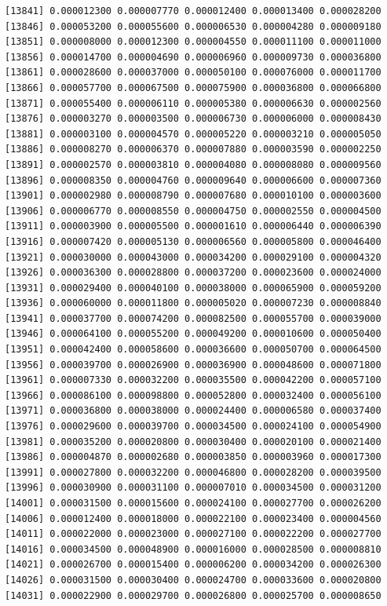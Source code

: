 \documentclass[]{article}
\begin{document}
\begin{verbatim}
[13841] 0.000012300 0.000007770 0.000012400 0.000013400 0.000028200
[13846] 0.000053200 0.000055600 0.000006530 0.000004280 0.000009180
[13851] 0.000008000 0.000012300 0.000004550 0.000011100 0.000011000
[13856] 0.000014700 0.000004690 0.000006960 0.000009730 0.000036800
[13861] 0.000028600 0.000037000 0.000050100 0.000076000 0.000011700
[13866] 0.000057700 0.000067500 0.000075900 0.000036800 0.000066800
[13871] 0.000055400 0.000006110 0.000005380 0.000006630 0.000002560
[13876] 0.000003270 0.000003500 0.000006730 0.000006000 0.000008430
[13881] 0.000003100 0.000004570 0.000005220 0.000003210 0.000005050
[13886] 0.000008270 0.000006370 0.000007880 0.000003590 0.000002250
[13891] 0.000002570 0.000003810 0.000004080 0.000008080 0.000009560
[13896] 0.000008350 0.000004760 0.000009640 0.000006600 0.000007360
[13901] 0.000002980 0.000008790 0.000007680 0.000010100 0.000003600
[13906] 0.000006770 0.000008550 0.000004750 0.000002550 0.000004500
[13911] 0.000003900 0.000005500 0.000001610 0.000006440 0.000006390
[13916] 0.000007420 0.000005130 0.000006560 0.000005800 0.000046400
[13921] 0.000030000 0.000043000 0.000034200 0.000029100 0.000004320
[13926] 0.000036300 0.000028800 0.000037200 0.000023600 0.000024000
[13931] 0.000029400 0.000040100 0.000038000 0.000065900 0.000059200
[13936] 0.000060000 0.000011800 0.000005020 0.000007230 0.000008840
[13941] 0.000037700 0.000074200 0.000082500 0.000055700 0.000039000
[13946] 0.000064100 0.000055200 0.000049200 0.000010600 0.000050400
[13951] 0.000042400 0.000058600 0.000036600 0.000050700 0.000064500
[13956] 0.000039700 0.000026900 0.000036900 0.000048600 0.000071800
[13961] 0.000007330 0.000032200 0.000035500 0.000042200 0.000057100
[13966] 0.000086100 0.000098800 0.000052800 0.000032400 0.000056100
[13971] 0.000036800 0.000038000 0.000024400 0.000006580 0.000037400
[13976] 0.000029600 0.000039700 0.000034500 0.000024100 0.000054900
[13981] 0.000035200 0.000020800 0.000030400 0.000020100 0.000021400
[13986] 0.000004870 0.000002680 0.000003850 0.000003960 0.000017300
[13991] 0.000027800 0.000032200 0.000046800 0.000028200 0.000039500
[13996] 0.000030900 0.000031100 0.000007010 0.000034500 0.000031200
[14001] 0.000031500 0.000015600 0.000024100 0.000027700 0.000026200
[14006] 0.000012400 0.000018000 0.000022100 0.000023400 0.000004560
[14011] 0.000022000 0.000023000 0.000027100 0.000022200 0.000027700
[14016] 0.000034500 0.000048900 0.000016000 0.000028500 0.000008810
[14021] 0.000026700 0.000015400 0.000006200 0.000034200 0.000026300
[14026] 0.000031500 0.000030400 0.000024700 0.000033600 0.000020800
[14031] 0.000022900 0.000029700 0.000026800 0.000025700 0.000008650

\end{verbatim}
\end{document}

